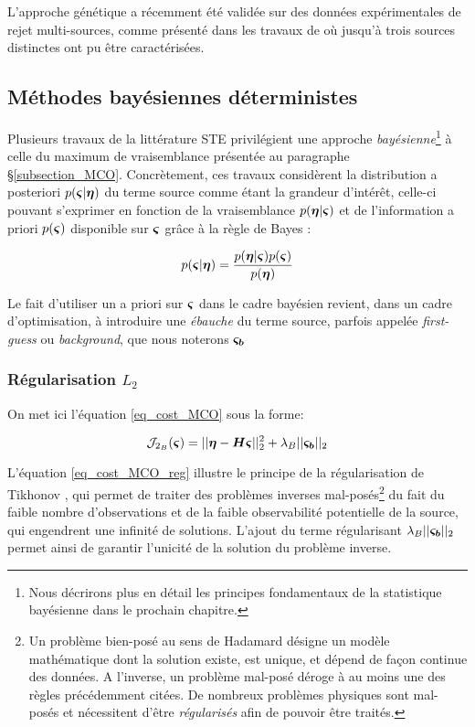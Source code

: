  L'approche génétique a récemment été validée sur des données expérimentales de rejet multi-sources, comme présenté dans les travaux de \cite{Cantelli2015} où jusqu'à trois sources distinctes ont pu être caractérisées.\\
 
 \subsection{Méthodes bayésiennes déterministes}
 
 Plusieurs travaux de la littérature STE privilégient une approche \textit{bayésienne}\footnote{Nous décrirons plus en détail les principes fondamentaux de la statistique bayésienne dans le prochain chapitre.} à celle du maximum de vraisemblance présentée au paragraphe §\ref{subsection_MCO}. Concrètement, ces travaux considèrent la distribution a posteriori $p({\bm{\varsigma}}|{\bm{\eta}})$ du terme source comme étant la grandeur d'intérêt, celle-ci pouvant s'exprimer en fonction de la vraisemblance $p({\bm{\eta}} | {\bm{\varsigma}})$ et de l'information a priori $p({\bm{\varsigma}})$ disponible sur ${\bm{\varsigma}}$ grâce à la règle de Bayes : 
 
 \begin{equation}
 p({\bm{\varsigma}}|{\bm{\eta}}) = \dfrac{p({\bm{\eta}} | {\bm{\varsigma}})p({\bm{\varsigma}})}{p({\bm{\eta}})}
 \label{eq_regle_bayes_edl}
 \end{equation}
 
Le fait d'utiliser un a priori sur ${\bm{\varsigma}}$ dans le cadre bayésien revient, dans un cadre d'optimisation, à introduire une \textit{ébauche} du terme source, parfois appelée \textit{first-guess} ou \textit{background}, que nous noterons ${\bm{\varsigma_b}}$

\subsubsection{Régularisation $L_2$}

On met ici l'équation \eqref{eq_cost_MCO} sous la forme: 
 
 \begin{equation}
 \mathcal{J}_{2_B}({\bm{\varsigma}}) = ||{\bm{\eta}} - {\bm{H}} {\bm{\varsigma}}||_2^2 + \lambda_B ||{\bm{\varsigma_b}}||_2
 \label{eq_cost_MCO_reg}
 \end{equation}
 
 L'équation \eqref{eq_cost_MCO_reg} illustre le principe de la régularisation de Tikhonov \cite{Tikhonov1963}, qui permet de traiter des problèmes inverses mal-posés\footnote{Un problème bien-posé au sens de Hadamard \cite{Hadamard1902} désigne un modèle mathématique dont la solution existe, est unique, et dépend de façon continue des données. A l'inverse, un problème mal-posé déroge à au moins une des règles précédemment citées. De nombreux problèmes physiques sont mal-posés et nécessitent d'être \textit{régularisés} afin de pouvoir être traités.} du fait du faible nombre d'observations et de la faible observabilité potentielle de la source, qui engendrent une infinité de solutions. L'ajout du terme régularisant $\lambda_B ||{\bm{\varsigma_b}}||_2$ permet ainsi de garantir l'unicité de la solution du problème inverse. \\
 

